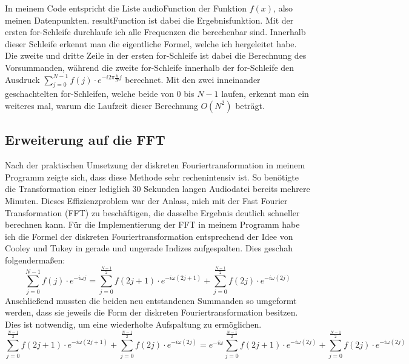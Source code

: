 \documentclass[a4paper,12pt]{article}
\theoremstyle{definition}
\theoremstyle{remark}
\begin{document}
In meinem Code entspricht die Liste audioFunction der Funktion $f(x)$, also meinen Datenpunkten. resultFunction ist dabei 
die Ergebnisfunktion. Mit der ersten for-Schleife durchlaufe ich alle Frequenzen die berechenbar sind. 
Innerhalb dieser Schleife erkennt man die eigentliche Formel, welche ich hergeleitet habe. Die zweite 
und dritte Zeile in der ersten for-Schleife ist dabei die Berechnung des Vorsummanden, während die zweite 
for-Schleife innerhalb der for-Schleife den Ausdruck $\sum_{j=0}^{N-1} f(j) \cdot e^{-i 2 \pi \frac{k}{N} j}$ 
berechnet. Mit den zwei inneinander geschachtelten for-Schleifen, welche beide von $0$ bis $N-1$ laufen, 
erkennt man ein weiteres mal, warum die Laufzeit dieser Berechnung $O(N^2)$ beträgt.  

\subsection{Erweiterung auf die FFT}
Nach der praktischen Umsetzung der diskreten Fouriertransformation in meinem Programm zeigte sich, dass diese Methode 
sehr rechenintensiv ist. So benötigte die Transformation einer lediglich 30 Sekunden langen Audiodatei bereits mehrere 
Minuten. Dieses Effizienzproblem war der Anlass, mich mit der Fast Fourier Transformation (FFT) zu beschäftigen, die dasselbe 
Ergebnis deutlich schneller berechnen kann. Für die Implementierung der FFT in meinem Programm habe ich die Formel der diskreten 
Fouriertransformation entsprechend der Idee von Cooley und Tukey in gerade und ungerade Indizes aufgespalten. Dies geschah 
folgendermaßen:
\[
\sum_{j=0}^{N-1}{f(j)\cdot e^{-i\omega j}} = \sum_{j=0}^{\frac{N-1}{2}}{f(2j+1)\cdot e^{-i \omega (2j+1)}} + \sum_{j=0}^{\frac{N-1}{2}}{f(2j)\cdot e^{-i \omega (2j)}}
\]
Anschließend mussten die beiden neu entstandenen Summanden so umgeformt werden, dass sie jeweils die Form der diskreten 
Fouriertransformation besitzen. Dies ist notwendig, um eine wiederholte Aufspaltung zu ermöglichen.
\[
\sum_{j=0}^{\frac{N-1}{2}}{f(2j+1)\cdot e^{-i \omega (2j+1)}} + \sum_{j=0}^{\frac{N-1}{2}}{f(2j)\cdot e^{-i \omega (2j)}} = e^{-i\omega}\sum_{j=0}^{\frac{N-1}{2}}{f(2j+1)\cdot e^{-i \omega (2j)}} + \sum_{j=0}^{\frac{N-1}{2}}{f(2j)\cdot e^{-i \omega (2j)}}
\]
\end{document}
